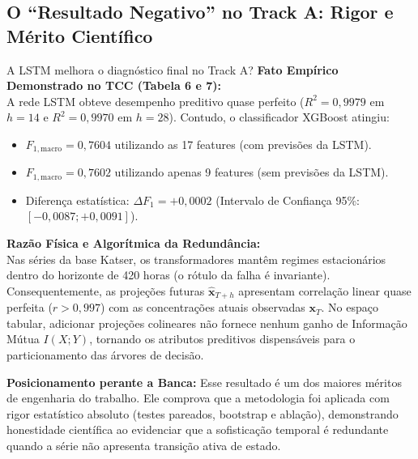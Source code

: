 \documentclass[11pt,a4paper]{article}
\begin{document}
\subsection{O ``Resultado Negativo'' no Track A: Rigor e Mérito Científico}
\begin{decisionBox}{A LSTM melhora o diagnóstico final no Track A?}
\textbf{Fato Empírico Demonstrado no TCC (Tabela 6 e 7):}\\
A rede LSTM obteve desempenho preditivo quase perfeito ($R^2 = 0{,}9979$ em $h=14$ e $R^2 = 0{,}9970$ em $h=28$). Contudo, o classificador XGBoost atingiu:
\begin{itemize}
  \item $F_{1, \text{macro}} = 0{,}7604$ utilizando as 17 features (com previsões da LSTM).
  \item $F_{1, \text{macro}} = 0{,}7602$ utilizando apenas 9 features (sem previsões da LSTM).
  \item Diferença estatística: $\Delta F_1 = +0{,}0002$ (Intervalo de Confiança 95\%: $[-0{,}0087; +0{,}0091]$).
\end{itemize}
\textbf{Razão Física e Algorítmica da Redundância:}\\
Nas séries da base Katser, os transformadores mantêm regimes estacionários dentro do horizonte de 420 horas (o rótulo da falha é invariante). Consequentemente, as projeções futuras $\hat{\mathbf{x}}_{T+h}$ apresentam correlação linear quase perfeita ($r > 0{,}997$) com as concentrações atuais observadas $\mathbf{x}_T$. No espaço tabular, adicionar projeções colineares não fornece nenhum ganho de Informação Mútua $I(X; Y)$, tornando os atributos preditivos dispensáveis para o particionamento das árvores de decisão.

\textbf{Posicionamento perante a Banca:} Esse resultado é um dos maiores méritos de engenharia do trabalho. Ele comprova que a metodologia foi aplicada com rigor estatístico absoluto (testes pareados, bootstrap e ablação), demonstrando honestidade científica ao evidenciar que a sofisticação temporal é redundante quando a série não apresenta transição ativa de estado.
\end{decisionBox}
\end{document}
